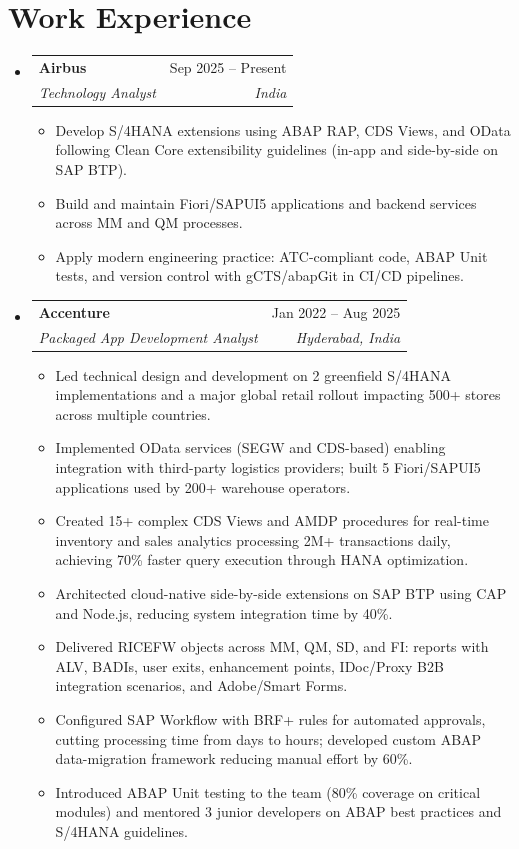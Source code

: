 \documentclass[letterpaper,11pt]{article}
\makeatletter
\newcommand{\resumeItem}[1]{
  \item\small{
    {#1 \vspace{-2pt}}
  }
}
\newcommand{\resumeSubheading}[4]{
  \vspace{-2pt}\item
    \begin{tabular*}{0.97\textwidth}[t]{l@{\extracolsep{\fill}}r}
      \textbf{#1} & #2 \\
      \textit{\small#3} & \textit{\small #4} \\
    \end{tabular*}\vspace{-7pt}
}
\newcommand{\resumeSubHeadingListStart}{\begin{itemize}[leftmargin=0.15in, label={}]}
\newcommand{\resumeSubHeadingListEnd}{\end{itemize}}
\newcommand{\resumeItemListStart}{\begin{itemize}}
\newcommand{\resumeItemListEnd}{\end{itemize}\vspace{-5pt}}
\makeatother
\begin{document}
\section{Work Experience}
  \resumeSubHeadingListStart

    \resumeSubheading
      {Airbus}{Sep 2025 -- Present}
      {Technology Analyst}{India}
      \resumeItemListStart
        \resumeItem{Develop S/4HANA extensions using ABAP RAP, CDS Views, and OData following Clean Core extensibility guidelines (in-app and side-by-side on SAP BTP).}
        \resumeItem{Build and maintain Fiori/SAPUI5 applications and backend services across MM and QM processes.}
        \resumeItem{Apply modern engineering practice: ATC-compliant code, ABAP Unit tests, and version control with gCTS/abapGit in CI/CD pipelines.}
      \resumeItemListEnd

    \resumeSubheading
      {Accenture}{Jan 2022 -- Aug 2025}
      {Packaged App Development Analyst}{Hyderabad, India}
      \resumeItemListStart
        \resumeItem{Led technical design and development on 2 greenfield S/4HANA implementations and a major global retail rollout impacting 500+ stores across multiple countries.}
        \resumeItem{Implemented OData services (SEGW and CDS-based) enabling integration with third-party logistics providers; built 5 Fiori/SAPUI5 applications used by 200+ warehouse operators.}
        \resumeItem{Created 15+ complex CDS Views and AMDP procedures for real-time inventory and sales analytics processing 2M+ transactions daily, achieving 70\% faster query execution through HANA optimization.}
        \resumeItem{Architected cloud-native side-by-side extensions on SAP BTP using CAP and Node.js, reducing system integration time by 40\%.}
        \resumeItem{Delivered RICEFW objects across MM, QM, SD, and FI: reports with ALV, BADIs, user exits, enhancement points, IDoc/Proxy B2B integration scenarios, and Adobe/Smart Forms.}
        \resumeItem{Configured SAP Workflow with BRF+ rules for automated approvals, cutting processing time from days to hours; developed custom ABAP data-migration framework reducing manual effort by 60\%.}
        \resumeItem{Introduced ABAP Unit testing to the team (80\% coverage on critical modules) and mentored 3 junior developers on ABAP best practices and S/4HANA guidelines.}

      \resumeItemListEnd

  \resumeSubHeadingListEnd

\end{document}
